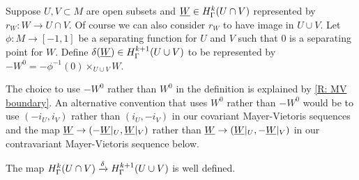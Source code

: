 \begin{definition}
Suppose $U,V\subset M$ are open subsets and $\underline{W}\in H^k_\Gamma(U\cap V)$ represented by $r_W:W\to U\cap V$. Of course we can also consider $r_W$ to have image in $U\cup V$. Let $\phi:M\to [-1,1]$ be a separating function for $U$ and $V$ such that $0$ is a separating point for $W$.
Define $\delta(\underline{W})\in H^{k+1}_\Gamma(U\cup V)$ to be represented by $-W^0=-\phi^{-1}(0)\times_{U\cup V}W$.
\end{definition}

The choice to use $-W^0$ rather than $W^0$ in the definition is explained by \cref{R: MV boundary}. An alternative convention that uses $W^0$ rather than $-W^0$ would be to use $(-i_U,i_V)$ rather than $(i_U,-i_V)$ in our covariant Mayer-Vietoris sequences and the map $\underline{W}\to (-\underline{W}|_U, \underline{W}|_V)$ rather than $\underline{W}\to (\underline{W}|_U, -\underline{W}|_V)$ in our contravariant Mayer-Vietoris sequence below.



\begin{proposition}\label{P: connecting}
The map $H^k_\Gamma(U\cap V)\xrightarrow{\delta} H^{k+1}_\Gamma(U\cup V)$ is well defined.
\end{proposition}

